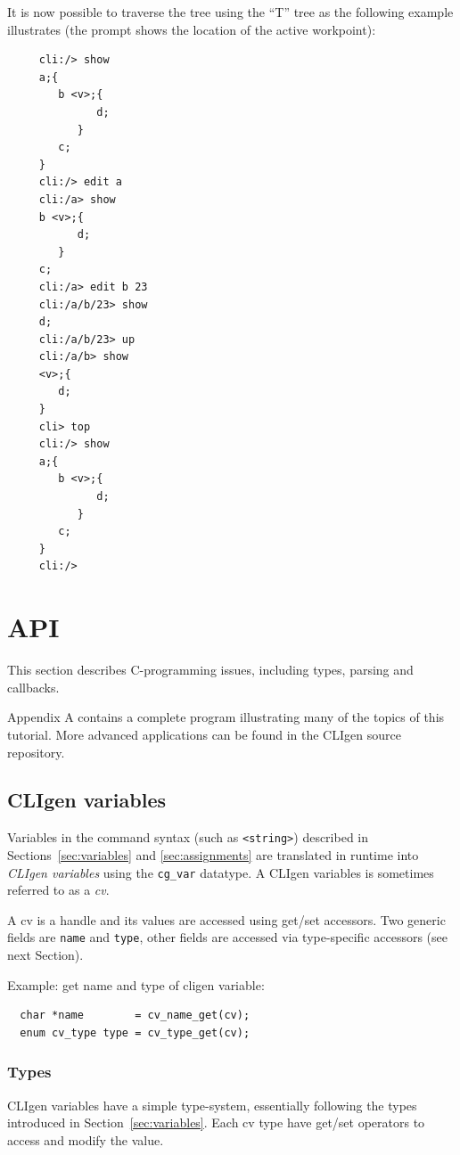 \documentclass[a4paper, 10pt] {article}
\begin{document}
It is now possible to traverse the tree using the ``T'' tree as the following example illustrates (the prompt shows the location of the active workpoint):
\begin{verbatim}
     cli:/> show
     a;{
        b <v>;{
              d;
           }
        c;
     }
     cli:/> edit a
     cli:/a> show
     b <v>;{
           d;
        }
     c;
     cli:/a> edit b 23
     cli:/a/b/23> show
     d;
     cli:/a/b/23> up
     cli:/a/b> show
     <v>;{
        d;
     }
     cli> top
     cli:/> show
     a;{
        b <v>;{
              d;
           }
        c;
     }
     cli:/>
\end{verbatim}

\section{API}
\label{sec:api}
This section describes C-programming issues, including types, parsing and
callbacks.

Appendix A contains a complete program illustrating many of the topics
of this tutorial.  More advanced applications can be found in the CLIgen
source repository.

\subsection{CLIgen variables}

Variables in the command syntax (such as {\tt <string>}) described in
Sections~\ref{sec:variables} and \ref{sec:assignments} are translated
in runtime into \emph{CLIgen variables} using the {\tt cg\_var}
datatype.  A CLIgen variables is sometimes referred to as a \emph{cv}.

A cv is a handle and its values are accessed using get/set
accessors. Two generic fields are {\tt name} and {\tt type}, other
fields are accessed via type-specific accessors (see next Section).

Example: get name and type of cligen variable:
\begin{verbatim}
  char *name        = cv_name_get(cv);
  enum cv_type type = cv_type_get(cv);
\end{verbatim}

\subsubsection{Types}

CLIgen variables have a simple type-system, essentially following the
types introduced in Section~\ref{sec:variables}. Each cv type
have get/set operators to access and modify the value.
\end{document}
